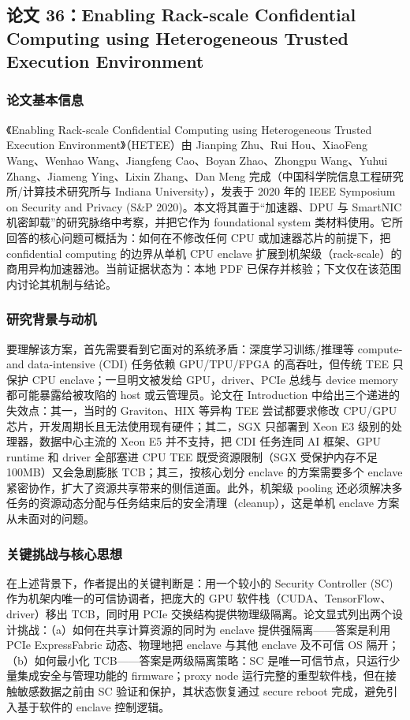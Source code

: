 \documentclass[11pt]{ctexart}
\begin{document}
\subsection{论文 36：Enabling Rack-scale Confidential Computing using Heterogeneous Trusted Execution Environment}
\subsubsection{论文基本信息}
《Enabling Rack-scale Confidential Computing using Heterogeneous Trusted Execution Environment》（HETEE）由 Jianping Zhu、Rui Hou、XiaoFeng Wang、Wenhao Wang、Jiangfeng Cao、Boyan Zhao、Zhongpu Wang、Yuhui Zhang、Jiameng Ying、Lixin Zhang、Dan Meng 完成（中国科学院信息工程研究所/计算技术研究所与 Indiana University），发表于 2020 年的 IEEE Symposium on Security and Privacy (S\&P 2020)。本文将其置于``加速器、DPU 与 SmartNIC 机密卸载''的研究脉络中考察，并把它作为 foundational system 类材料使用。它所回答的核心问题可概括为：如何在不修改任何 CPU 或加速器芯片的前提下，把 confidential computing 的边界从单机 CPU enclave 扩展到机架级（rack-scale）的商用异构加速器池。当前证据状态为：本地 PDF 已保存并核验；下文仅在该范围内讨论其机制与结论。\cite{zhu2020hetee}\par
\subsubsection{研究背景与动机}
要理解该方案，首先需要看到它面对的系统矛盾：深度学习训练/推理等 compute- and data-intensive (CDI) 任务依赖 GPU/TPU/FPGA 的高吞吐，但传统 TEE 只保护 CPU enclave；一旦明文被发给 GPU，driver、PCIe 总线与 device memory 都可能暴露给被攻陷的 host 或云管理员。论文在 Introduction 中给出三个递进的失效点：其一，当时的 Graviton、HIX 等异构 TEE 尝试都要求修改 CPU/GPU 芯片，开发周期长且无法使用现有硬件；其二，SGX 只部署到 Xeon E3 级别的处理器，数据中心主流的 Xeon E5 并不支持，把 CDI 任务连同 AI 框架、GPU runtime 和 driver 全部塞进 CPU TEE 既受资源限制（SGX 受保护内存不足 100MB）又会急剧膨胀 TCB；其三，按核心划分 enclave 的方案需要多个 enclave 紧密协作，扩大了资源共享带来的侧信道面。此外，机架级 pooling 还必须解决多任务的资源动态分配与任务结束后的安全清理（cleanup），这是单机 enclave 方案从未面对的问题。\par
\subsubsection{关键挑战与核心思想}
在上述背景下，作者提出的关键判断是：用一个较小的 Security Controller (SC) 作为机架内唯一的可信协调者，把庞大的 GPU 软件栈（CUDA、TensorFlow、driver）移出 TCB，同时用 PCIe 交换结构提供物理级隔离。论文显式列出两个设计挑战：（a）如何在共享计算资源的同时为 enclave 提供强隔离——答案是利用 PCIe ExpressFabric 动态、物理地把 enclave 与其他 enclave 及不可信 OS 隔开；（b）如何最小化 TCB——答案是两级隔离策略：SC 是唯一可信节点，只运行少量集成安全与管理功能的 firmware；proxy node 运行完整的重型软件栈，但在接触敏感数据之前由 SC 验证和保护，其状态恢复通过 secure reboot 完成，避免引入基于软件的 enclave 控制逻辑。\par
\end{document}

